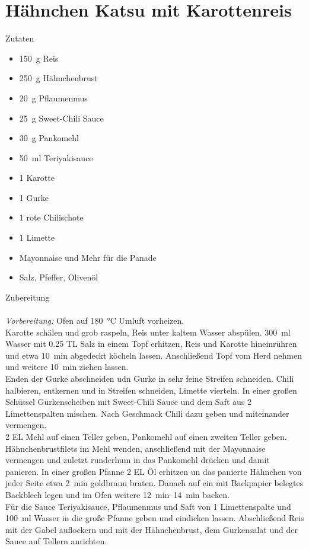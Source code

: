\section*{Hähnchen Katsu mit Karottenreis}
\ihead{}\ohead{}
\cfoot{}
{\Large Zutaten}
\begin{multicols}{2}
\begin{itemize}
    \item \SI{150}{g} Reis
    \item \SI{250}{g} Hähnchenbrust
    \item \SI{20}{g} Pflaumenmus
    \item \SI{25}{g} Sweet-Chili Sauce
    \item \SI{30}{g} Pankomehl 
    \item \SI{50}{ml} Teriyakisauce
    \item \num{1} Karotte
    \item \num{1} Gurke
    \item \num{1} rote Chilischote
    \item \num{1} Limette
    \item Mayonnaise und Mehr für die Panade
    \item Salz, Pfeffer, Olivenöl
\end{itemize}
\end{multicols}
\noindent
{\Large Zubereitung}\\
\\
\textit{Vorbereitung:} Ofen auf \SI{180}{\celsius} Umluft vorheizen.\\
Karotte schälen und grob raspeln, Reis unter kaltem Wasser abspülen.
\SI{300}{ml} Wasser mit \num{0.25} TL Salz in einem Topf erhitzen, Reis und Karotte hineinrühren und etwa \SI{10}{min} abgedeckt köcheln lassen.
Anschließend Topf vom Herd nehmen und weitere \SI{10}{min} ziehen lassen.\\
Enden der Gurke abschneiden udn Gurke in sehr feine Streifen schneiden.
Chili halbieren, entkernen und in Streifen schneiden, Limette vierteln.
In einer großen Schüssel Gurkenscheiben mit Sweet-Chili Sauce und dem Saft aus 2 Limettenspalten mischen. 
Nach Geschmack Chili dazu geben und miteinander vermengen.\\
\num{2} EL Mehl auf einen Teller geben, Pankomehl auf einen zweiten Teller geben.
Hähnchenbrustfilets im Mehl wenden, anschließend mit der Mayonnaise vermengen und zuletzt runderhum in das Pankomehl drücken und damit panieren.
In einer großen Pfanne \num{2} EL Öl erhitzen un das panierte Hähnchen von jeder Seite etwa \SI{2}{min} goldbraun braten.
Danach auf ein mit Backpapier belegtes Backblech legen und im Ofen weitere \SIrange{12}{14}{min} backen.\\
Für die Sauce Teriyakisauce, Pflaumenmus und Saft von \num{1} Limettenspalte und \SI{100}{ml} Wasser in die große Pfanne geben und eindicken lassen. 
Abschließend Reis mit der Gabel auflockern und mit der Hähnchenbrust, dem Gurkensalat und der Sauce auf Tellern anrichten.



